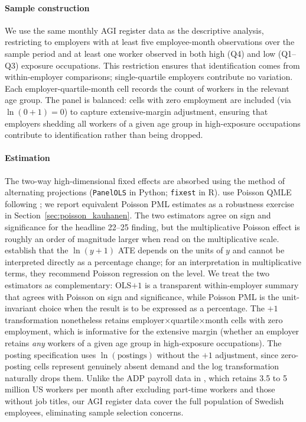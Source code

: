 \documentclass[preprint,12pt,authoryear]{elsarticle}
\begin{document}
\paragraph{Sample construction}
We use the same monthly AGI register data as the descriptive analysis, restricting to employers with at least five employee-month observations over the sample period and at least one worker observed in both high (Q4) and low (Q1--Q3) exposure occupations. This restriction ensures that identification comes from within-employer comparisons; single-quartile employers contribute no variation. Each employer-quartile-month cell records the count of workers in the relevant age group. The panel is balanced: cells with zero employment are included (via $\ln(0+1)=0$) to capture extensive-margin adjustment, ensuring that employers shedding all workers of a given age group in high-exposure occupations contribute to identification rather than being dropped.

\paragraph{Estimation}
The two-way high-dimensional fixed effects are absorbed using the method of alternating projections (\texttt{PanelOLS} in Python; \texttt{fixest} in R). \citet{brynjolfsson2025canaries} use Poisson QMLE following \citet{chen2024logs}; we report equivalent Poisson PML estimates as a robustness exercise in Section~\ref{sec:poisson_kauhanen}. The two estimators agree on sign and significance for the headline 22--25 finding, but the multiplicative Poisson effect is roughly an order of magnitude larger when read on the multiplicative scale. \citet{chen2024logs} establish that the $\ln(y+1)$ ATE depends on the units of $y$ and cannot be interpreted directly as a percentage change; for an interpretation in multiplicative terms, they recommend Poisson regression on the level. We treat the two estimators as complementary: OLS$+1$ is a transparent within-employer summary that agrees with Poisson on sign and significance, while Poisson PML is the unit-invariant choice when the result is to be expressed as a percentage. The $+1$ transformation nonetheless retains employer$\times$quartile$\times$month cells with zero employment, which is informative for the extensive margin (whether an employer retains \emph{any} workers of a given age group in high-exposure occupations). The posting specification uses $\ln(\text{postings})$ without the $+1$ adjustment, since zero-posting cells represent genuinely absent demand and the log transformation naturally drops them. Unlike the ADP payroll data in \citet{brynjolfsson2025canaries}, which retains 3.5 to 5 million US workers per month after excluding part-time workers and those without job titles, our AGI register data cover the full population of Swedish employees, eliminating sample selection concerns.
\end{document}
